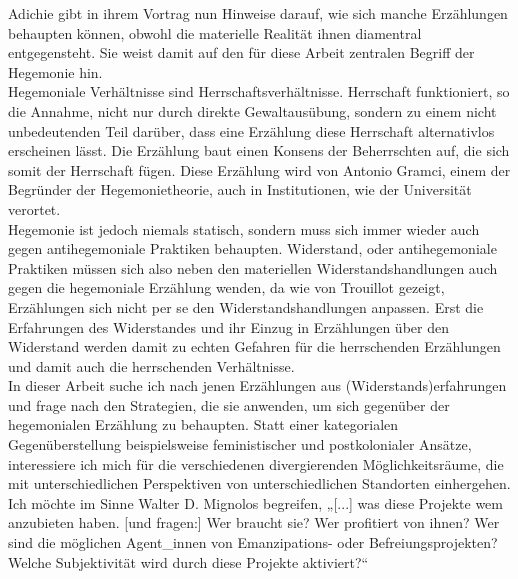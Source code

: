 Adichie gibt in ihrem Vortrag nun Hinweise darauf, wie sich manche
Erzählungen behaupten können, obwohl die materielle Realität ihnen diamentral
entgegensteht. Sie weist damit auf den für diese Arbeit zentralen Begriff der
Hegemonie hin.\\
Hegemoniale Verhältnisse sind
Herrschaftsverhältnisse.\footnotemark{} Herrschaft
funktioniert, so die Annahme, nicht nur durch direkte Gewaltausübung, sondern
zu einem nicht unbedeutenden Teil darüber, dass eine Erzählung diese Herrschaft
alternativlos erscheinen lässt. Die Erzählung baut einen Konsens der
Beherrschten auf, die sich somit der Herrschaft fügen. Diese Erzählung wird von
Antonio Gramci, einem der Begründer der Hegemonietheorie, auch in
Institutionen, wie der Universität verortet.\\
Hegemonie ist jedoch niemals statisch, sondern muss sich immer wieder auch
gegen antihegemoniale Praktiken behaupten. Widerstand, oder antihegemoniale
Praktiken müssen sich also neben den materiellen Widerstandshandlungen auch
gegen die hegemoniale Erzählung wenden, da wie von Trouillot gezeigt,
Erzählungen sich nicht per se den Widerstandshandlungen anpassen. Erst die
Erfahrungen des Widerstandes und ihr Einzug in Erzählungen über den Widerstand
werden damit zu echten Gefahren für die herrschenden Erzählungen und damit auch
die herrschenden Verhältnisse.\\


In dieser Arbeit suche ich nach jenen Erzählungen aus (Widerstands)erfahrungen
und frage nach den Strategien, die sie anwenden, um sich gegenüber der
hegemonialen Erzählung zu behaupten. Statt einer kategorialen Gegenüberstellung
beispielsweise feministischer und postkolonialer Ansätze, interessiere ich mich
für die verschiedenen divergierenden Möglichkeitsräume, die mit
unterschiedlichen Perspektiven von unterschiedlichen Standorten einhergehen.
Ich möchte im Sinne Walter D. Mignolos begreifen, „[...] was diese Projekte wem
anzubieten haben. [und fragen:] Wer braucht sie? Wer profitiert von ihnen? Wer
sind die möglichen Agent\_innen von Emanzipations- oder Befreiungsprojekten?
Welche Subjektivität wird durch diese Projekte
aktiviert?“\footnotemark{}\\

